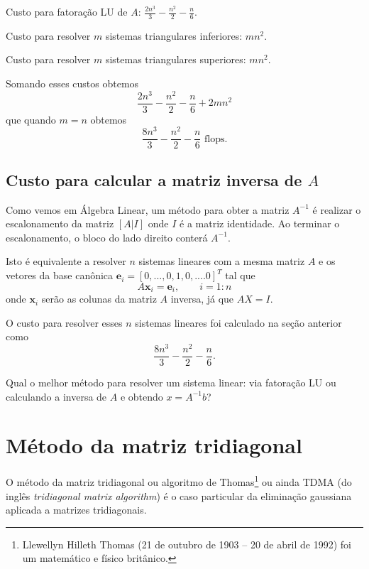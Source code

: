 Custo para fatoração LU de $A$: $\frac{2n^3}{3}-\frac{n^2}{2}-\frac{n}{6}$.

Custo para resolver $m$ sistemas triangulares inferiores: $m n^2 $.

Custo para resolver $m$ sistemas triangulares superiores: $m n^2 $.

Somando esses custos obtemos
\begin{equation} \frac{2n^3}{3}-\frac{n^2}{2}-\frac{n}{6}+2m n^2  \end{equation}
que quando $m=n$ obtemos
\begin{equation} \frac{8n^3}{3}-\frac{n^2}{2}-\frac{n}{6} \text{~flops}. \end{equation}

\subsection{Custo para calcular a matriz inversa de $A$}
Como vemos em Álgebra Linear, um método para obter a matriz $A^{-1}$ é realizar o escalonamento da matriz $[A|I]$ onde $I$ é a matriz identidade. Ao terminar o escalonamento, o bloco do lado direito conterá $A^{-1}$.

Isto é equivalente a resolver $n$ sistemas lineares com a mesma matriz $A$ e os vetores da base canônica $\pmb e_i = [0,...,0,1,0,....0]^T$ tal que
\begin{equation}  A \pmb x_i = \pmb e_i, \quad\quad i=1:n  \end{equation}
onde $\pmb x_i$ serão as colunas da matriz $A$ inversa, já que $A X=I$.

O custo para resolver esses $n$ sistemas lineares foi calculado na seção anterior como
\begin{equation} \frac{8n^3}{3}-\frac{n^2}{2}-\frac{n}{6}. \end{equation}

\begin{ex}
 Qual o melhor método para resolver um sistema linear: via fatoração LU ou calculando a inversa de $A$ e obtendo $x=A^{-1}b$?
\end{ex}


\section{Método da matriz tridiagonal}
O método da matriz tridiagonal ou algoritmo de Thomas\footnote{Llewellyn Hilleth Thomas (21 de outubro de 1903 – 20 de abril de 1992) foi um matemático e físico britânico.} ou ainda TDMA (do inglês {\it tridiagonal matrix algorithm}) é o caso particular da eliminação gaussiana aplicada a matrizes tridiagonais.

